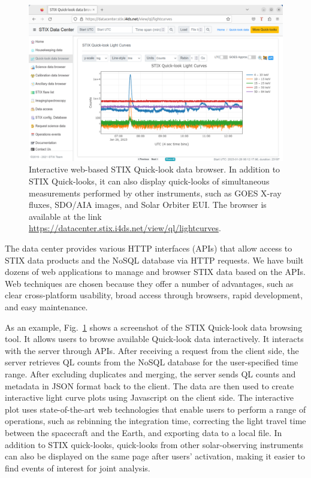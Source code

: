 \documentclass[referee]{aa} %
\begin{document}
\begin{figure}[h]
  \centering
  \includegraphics[width=0.7\linewidth]{figures/data-browser.pdf}
  \caption{ 
    Interactive web-based STIX Quick-look data browser. 
    In addition to STIX Quick-looks, it can also display quick-looks of simultaneous measurements 
    performed by other instruments, such as GOES X-ray fluxes, SDO/AIA images, and Solar Orbiter EUI. 
    The browser is available at the link \url{https://datacenter.stix.i4ds.net/view/ql/lightcurves}.}
  \label{fig:qlbrowser}
\end{figure}
The data center provides various HTTP interfaces (APIs) that allow access to STIX data products
and the NoSQL database via HTTP requests. 
We have built dozens of web applications to manage and browser STIX data based on the APIs. 
Web techniques are chosen because they offer a number of advantages, such as clear cross-platform 
usability, broad access through browsers, rapid development, and easy maintenance.

As an example, Fig.~\ref{fig:qlbrowser} shows a screenshot of the STIX Quick-look data browsing 
tool. It allows users to browse available Quick-look data interactively. It 
interacts with the server through APIs. 
After receiving a request from the client side,
the server retrieves QL counts from the NoSQL database for the user-specified time range. 
After excluding duplicates and merging,  the server sends QL counts and metadata in JSON format back to the client. The data are then used to create interactive light curve plots using Javascript on the client side. 
The interactive plot uses state-of-the-art web technologies that enable users to perform a range of operations, such as rebinning the integration time, correcting the light travel time between the spacecraft and the Earth, and exporting data to a local file. In addition to STIX quick-looks, quick-looks from other solar-observing instruments can also be displayed on the same page after users' activation, 
making it easier to find events of interest for joint analysis.
\end{document}
